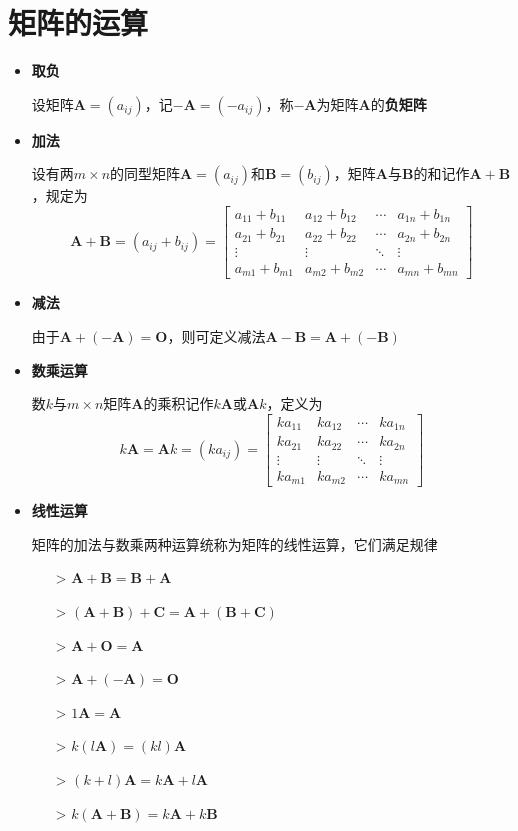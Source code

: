 \documentclass[UTF8]{ctexart}
\newcommand{\ve}[1]{{\bm{#1}}}
\newcommand{\mat}[1]{\ve{#1}}
\begin{document}
\section*{矩阵的运算}
\begin{itemize}
  \item \textbf{取负}

  设矩阵$\mat{A}=(a_{ij})$，记$-\mat{A}=(-a_{ij})$，称$-\mat{A}$为矩阵$\mat{A}$的\textbf{负矩阵}
  \item \textbf{加法}

  设有两$m\times n$的同型矩阵$\mat{A}=(a_{ij})$和$\mat{B}=(b_{ij})$，矩阵$\mat{A}$与$\mat{B}$的和记作$\mat{A}+\mat{B}$，规定为
  \[\mat{A}+\mat{B}=(a_{ij}+b_{ij})=\begin{bmatrix}
  a_{11}+b_{11}&a_{12}+b_{12}&\cdots&a_{1n}+b_{1n}\\
  a_{21}+b_{21}&a_{22}+b_{22}&\cdots&a_{2n}+b_{2n}\\
  \vdots&\vdots&\ddots&\vdots\\
  a_{m1}+b_{m1}&a_{m2}+b_{m2}&\cdots&a_{mn}+b_{mn}
  \end{bmatrix}\]

  \item \textbf{减法}

  由于$\mat{A}+(-\mat{A})=\mat{O}$，则可定义减法$\mat{A}-\mat{B}=\mat{A}+(-\mat{B})$

  \item \textbf{数乘运算}

  数$k$与$m\times n$矩阵$\mat{A}$的乘积记作$k\mat{A}$或$\mat{A}k$，定义为
  \[k\mat{A}=\mat{A}k=(ka_{ij})=\begin{bmatrix}
  ka_{11}&ka_{12}&\cdots&ka_{1n}\\
  ka_{21}&ka_{22}&\cdots&ka_{2n}\\
  \vdots&\vdots&\ddots&\vdots\\
  ka_{m1}&ka_{m2}&\cdots&ka_{mn}
  \end{bmatrix}\]

  \item \textbf{线性运算}

  矩阵的加法与数乘两种运算统称为矩阵的线性运算，它们满足规律
  \begin{itemize}
    \item[>] $\displaystyle \mat{A}+\mat{B}=\mat{B}+\mat{A}$
    \item[>] $\displaystyle (\mat{A}+\mat{B})+\mat{C}=\mat{A}+(\mat{B}+\mat{C})$
    \item[>] $\displaystyle \mat{A}+\mat{O}=\mat{A}$
    \item[>] $\displaystyle \mat{A}+(-\mat{A})=\mat{O}$
    \item[>] $\displaystyle 1\mat{A}=\mat{A}$
    \item[>] $\displaystyle k(l\mat{A})=(kl)\mat{A}$
    \item[>] $\displaystyle (k+l)\mat{A}=k\mat{A}+l\mat{A}$
    \item[>] $\displaystyle k(\mat{A}+\mat{B})=k\mat{A}+k\mat{B}$
  \end{itemize}


\end{itemize}
\end{document}
